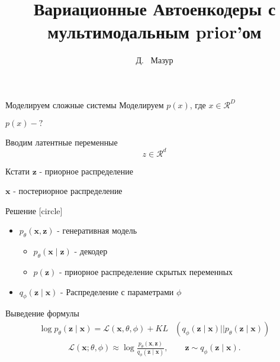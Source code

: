 \documentclass{beamer}
\title{Вариационные Автоенкодеры с мультимодальным prior'ом}
\author{Д. ~Мазур}
\institute[Гимназия 1505] 
{
  10 Б класс\\
  Школа 1505 "Преображенская"
 }
\begin{document}
    \begin{frame}
      \titlepage
    \end{frame}
    
    \begin{frame}{Моделируем сложные системы}{}
        Моделируем $p(x)$, где $x \in \mathcal{R}^D$ \pause

        $p(x) - ?$
    \end{frame}

    \begin{frame}{Вводим латентные переменные}{}
        $$z \in \mathcal{R}^d$$
    \end{frame}

    \begin{frame}{Кстати}{}
        $\mathbf{z}$ - приорное распределение

        $\mathbf{x}$ - постериорное распределение
    \end{frame}

    \begin{frame}{Решение}{}
        [circle]
        \begin{itemize}
        \item $p_\theta(\mathbf{x}, \mathbf{z})$ - генеративная модель
            \begin{itemize}
               \item $p_\theta(\mathbf{x} \mid \mathbf{z})$ - декодер
               \item $p(\mathbf{z})$ - приорное распределение скрытых переменных
            \end{itemize}
        \item $q_\phi(\mathbf{z} \mid \mathbf{x})$ - Распределение с параметрами $\phi$
        \end{itemize}
    \end{frame}

    \begin{frame}{Выведение формулы}{}
        \begin{align*}
        \log p_\theta(\mathbf{z} \mid \mathbf{x}) = \mathcal{L}(\mathbf{x}, \theta, \phi) +  KL &\left(q_\phi(\mathbf{z} \mid \mathbf{x}) || p_\theta(\mathbf{z} \mid \mathbf{x})\right)
        \end{align*}
        \begin{align*}
        \mathcal{L} (\mathbf{x}; \theta, \phi) \approx  \log \frac{
      p_\theta (\mathbf{x}, \mathbf{z})
    }{
      q_\phi (\mathbf{z} \mid \mathbf{x})
    }, \qquad \mathbf{z} \sim q_\phi (\mathbf{z} \mid \mathbf{x}). 
        \end{align*}
    \end{frame}
\end{document}
